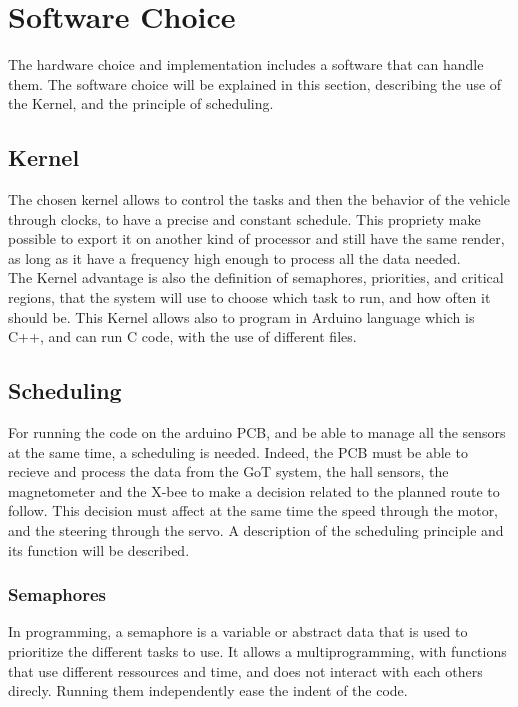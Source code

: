 \section{Software Choice}
The hardware choice and implementation includes a software that can handle them. The software choice will be explained in this section, describing the use of the Kernel, and the principle of scheduling.

\subsection{Kernel}
The chosen kernel allows to control the tasks and then the behavior of the vehicle through clocks, to have a precise and constant schedule. This propriety make possible to export it on another kind of processor and still have the same render, as long as it have a frequency high enough to process all the data needed.\\
The Kernel advantage is also the definition of semaphores, priorities, and critical regions, that the system will use to choose which task to run, and how often it should be. This Kernel allows also to program in Arduino language which is C++, and can run C code, with the use of different files.



\subsection{Scheduling}\label{sec:scheduling}
For running the code on the arduino PCB, and be able to manage all the sensors at the same time, a scheduling is needed. Indeed, the PCB must be able to recieve and process the data from the GoT system, the hall sensors, the magnetometer and the X-bee to make a decision related to the planned route to follow. This decision must affect at the same time the speed through the motor, and the steering through the servo.
A description of the scheduling principle and its function will be described.


\subsubsection{Semaphores}
In programming, a semaphore is a variable or abstract data that is used to prioritize the different tasks to use. It allows a multiprogramming, with functions that use different ressources and time, and does not interact with each others direcly. Running them independently ease the indent of the code.


